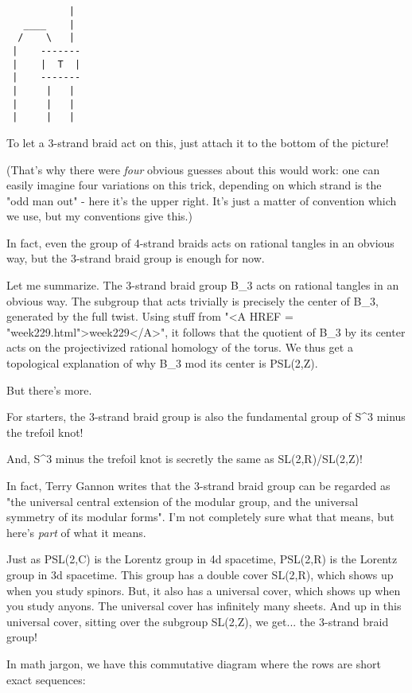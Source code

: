 \begin{verbatim}
           |
   ____    |               
  /    \   |              
 |    -------           
 |    |  T  |   
 |    -------  
 |     |   |  
 |     |   | 
 |     |   |
\end{verbatim}
    
To let a 3-strand braid act on this, just attach it to the bottom of
the picture!   

(That's why there were \emph{four} obvious guesses about this would work:
one can easily imagine four variations on this trick, depending on 
which strand is the "odd man out" - here it's the upper right.  It's
just a matter of convention which we use, but my conventions give this.)

In fact, even the group of 4-strand braids acts on rational tangles in 
an obvious way, but the 3-strand braid group is enough for now.

Let me summarize.  
The 3-strand braid group B_{3} acts on rational tangles
in an obvious way.  The subgroup that acts trivially is precisely the 
center of B_{3}, generated by the full twist.  
Using stuff from "<A HREF = "week229.html">week229</A>", 
it follows that the quotient of B_{3} by its center acts 
on the projectivized 
rational homology of the torus.  We thus get a topological explanation 
of why B_{3} mod its center is PSL(2,Z).

But there's more.

For starters, the 3-strand braid group is also the fundamental group of 
S^{3} minus the trefoil knot!

And, S^{3} minus the trefoil knot is secretly the same as
SL(2,R)/SL(2,Z)!

In fact, Terry Gannon writes that the 3-strand braid group can be
regarded as "the universal central extension of the modular
group, and the universal symmetry of its modular forms".  I'm not
completely sure what that means, but here's \emph{part} of what it
means.

Just as PSL(2,C) is the Lorentz group in 4d spacetime, PSL(2,R) is the 
Lorentz group in 3d spacetime.  This group has a double cover SL(2,R), 
which shows up when you study spinors.  But, it also has a universal 
cover, which shows up when you study anyons.  The universal cover has
infinitely many sheets.   And up in this universal cover, sitting over 
the subgroup SL(2,Z), we get... the 3-strand braid group!

In math jargon, we have this commutative diagram where the
rows are short exact sequences:


